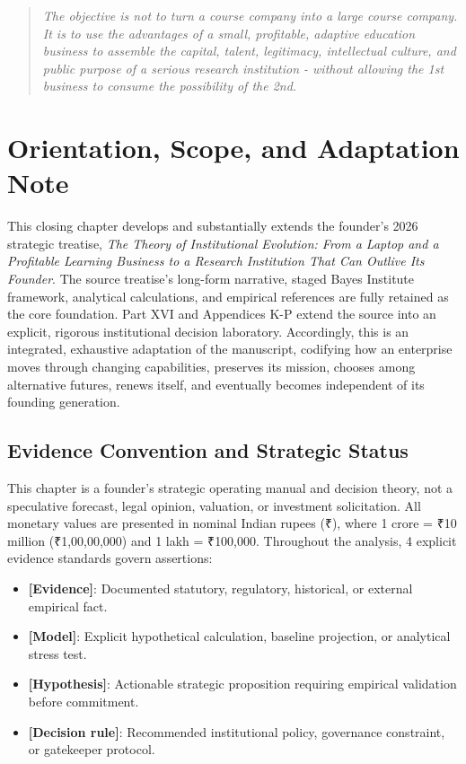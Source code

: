 
\begin{quote}
\itshape
The objective is not to turn a course company into a large course company. It is to use the advantages of a small, profitable, adaptive education business to assemble the capital, talent, legitimacy, intellectual culture, and public purpose of a serious research institution - without allowing the 1st business to consume the possibility of the 2nd.
\end{quote}

\section*{Orientation, Scope, and Adaptation Note}

This closing chapter develops and substantially extends the founder's 2026 strategic treatise, \textit{The Theory of Institutional Evolution: From a Laptop and a Profitable Learning Business to a Research Institution That Can Outlive Its Founder}. The source treatise's long-form narrative, staged Bayes Institute framework, analytical calculations, and empirical references are fully retained as the core foundation. Part XVI and Appendices K-P extend the source into an explicit, rigorous institutional decision laboratory. Accordingly, this is an integrated, exhaustive adaptation of the manuscript, codifying how an enterprise moves through changing capabilities, preserves its mission, chooses among alternative futures, renews itself, and eventually becomes independent of its founding generation.

\subsection*{Evidence Convention and Strategic Status}
This chapter is a founder's strategic operating manual and decision theory, not a speculative forecast, legal opinion, valuation, or investment solicitation. All monetary values are presented in nominal Indian rupees (\textnormal{₹}), where 1 crore = \textnormal{₹}10 million (\textnormal{₹}1,00,00,000) and 1 lakh = \textnormal{₹}100,000. Throughout the analysis, 4 explicit evidence standards govern assertions:
\begin{itemize}[leftmargin=*,itemsep=1.5pt]
  \item \textbf{[Evidence]}: Documented statutory, regulatory, historical, or external empirical fact.
  \item \textbf{[Model]}: Explicit hypothetical calculation, baseline projection, or analytical stress test.
  \item \textbf{[Hypothesis]}: Actionable strategic proposition requiring empirical validation before commitment.
  \item \textbf{[Decision rule]}: Recommended institutional policy, governance constraint, or gatekeeper protocol.
\end{itemize}

